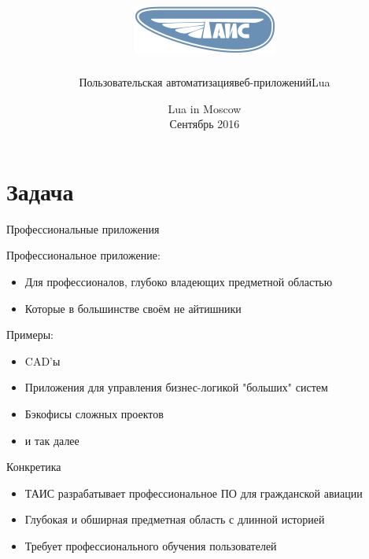 \documentclass[aspectratio=169,handout,bigger]{beamer}
\title{\includegraphics[height=.15\textheight]{logo}}
\author{Пользовательская автоматизация\newlineпрофессиональных веб-приложений\newlineна Lua}
\institute{Александр Гладыш\newline@agladysh}
\date{Lua in Moscow\\Сентябрь 2016}
\begin{document}
\maketitle


\section{Задача}


\begin{frame}{Профессиональные приложения}

Профессиональное приложение:

\begin{itemize}
\item Для профессионалов, глубоко владеющих предметной областью
\item Которые в большинстве своём не айтишники
\end{itemize}

Примеры:

\begin{itemize}
\item CAD'ы
\item Приложения для управления бизнес-логикой "больших" систем
\item Бэкофисы сложных проектов
\item и так далее
\end{itemize}

\end{frame}


\begin{frame}{Конкретика}

\begin{itemize}
\item ТАИС разрабатывает профессиональное ПО для гражданской авиации
\item Глубокая и обширная предметная область с длинной историей
\item Требует профессионального обучения пользователей
\end{itemize}

\end{frame}

\end{document}
